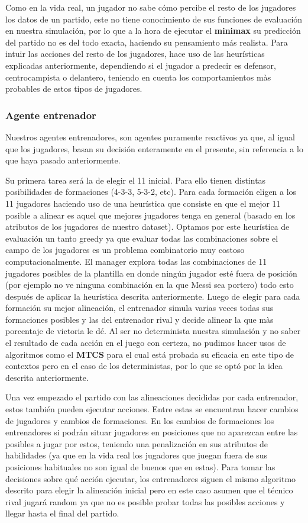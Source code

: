 \documentclass{article}
\begin{document}
Como en la vida real, un jugador no sabe cómo percibe el resto de los jugadores los datos de un partido, este no 
tiene conocimiento de sus funciones de evaluación en nuestra simulación, por lo que a la hora de ejecutar el \textbf{minimax}
su predicción del partido no es del todo exacta, haciendo su pensamiento más realista. Para intuir las acciones del 
resto de los jugadores, hace uso de las heurísticas explicadas anteriormente, dependiendo si el jugador a predecir 
es defensor, centrocampista o delantero, teniendo en cuenta los comportamientos màs probables de estos tipos de 
jugadores.

\subsubsection{Agente entrenador}
Nuestros agentes entrenadores, son agentes puramente reactivos ya que, al igual que los jugadores, basan 
su decisión enteramente en el presente, sin referencia a lo que haya pasado anteriormente.

Su primera tarea será la de elegir el 11 inicial. Para ello tienen distintas posibilidades de formaciones 
(4-3-3, 5-3-2, etc). Para cada formación eligen a los 11 jugadores haciendo uso de una heurística que consiste en 
que el mejor 11 posible a alinear es aquel que mejores jugadores tenga en general (basado en los atributos de los 
jugadores de nuestro dataset). Optamos por este heurística de evaluación un tanto greedy ya que evaluar todas las 
combinaciones sobre el campo de los jugadores es un problema combinatorio muy costoso computacionalmente. El manager 
explora todas las combinaciones de 11 jugadores posibles de la plantilla en donde ningún jugador esté fuera de 
posición (por ejemplo no ve ninguna combinación en la que Messi sea portero) todo esto después de aplicar la 
heurística descrita anteriormente. Luego de elegir para cada formación su mejor alineación, el entrenador simula 
varias veces todas sus formaciones posibles y las del entrenador rival y decide alinear la que màs porcentaje de 
victoria le dé. Al ser no determinista nuestra simulación y no saber el resultado de cada acción en el juego con 
certeza, no pudimos hacer usos de algoritmos como el \textbf{MTCS} para el cual está probada su eficacia en este tipo de 
contextos pero en el caso de los deterministas, por lo que se optó por la idea descrita anteriormente.

Una vez empezado el partido con las alineaciones decididas por cada entrenador, estos también pueden ejecutar 
acciones. Entre estas se encuentran hacer cambios de jugadores y cambios de formaciones. En los cambios de 
formaciones los entrenadores si podrán situar jugadores en posiciones que no aparezcan entre las posibles a jugar 
por estos, teniendo una penalización en sus atributos de habilidades (ya que en la vida real los jugadores que juegan 
fuera de sus posiciones habituales no son igual de buenos que en estas). Para tomar las decisiones sobre qué acción 
ejecutar, los entrenadores siguen el mismo algoritmo descrito para elegir la alineación inicial pero en este caso 
asumen que el técnico rival jugará random ya que no es posible probar todas las posibles acciones y llegar hasta el 
final del partido.
\end{document}
